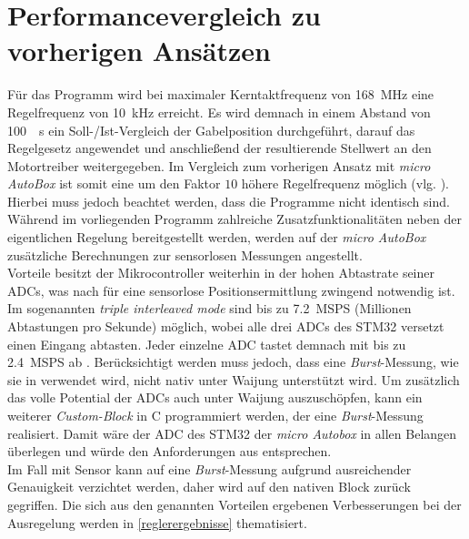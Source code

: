 \section{Performancevergleich zu vorherigen Ansätzen} \label{perfVergl}
Für das Programm wird bei maximaler Kerntaktfrequenz von \SI{168}{MHz} eine Regelfrequenz von \SI{10}{kHz} erreicht. Es wird demnach in einem Abstand von \SI{100}{\mu s} ein Soll-/Ist-Vergleich der Gabelposition durchgeführt, darauf das Regelgesetz angewendet und anschließend der resultierende Stellwert an den Motortreiber weitergegeben. Im Vergleich zum vorherigen Ansatz mit \textit{micro AutoBox} ist somit eine um den Faktor $10$ höhere Regelfrequenz möglich (vlg. \cite{vADP}). Hierbei muss jedoch beachtet werden, dass die Programme nicht identisch sind. Während im vorliegenden Programm zahlreiche Zusatzfunktionalitäten neben der eigentlichen Regelung bereitgestellt werden, werden auf der \textit{micro AutoBox} zusätzliche Berechnungen zur sensorlosen Messungen angestellt. \\
Vorteile besitzt der Mikrocontroller weiterhin in der hohen Abtastrate seiner ADCs, was nach \cite{vADP} für eine sensorlose Positionsermittlung zwingend notwendig ist. Im sogenannten \textit{triple interleaved mode} sind bis zu \SI{7,2}{MSPS} (Millionen Abtastungen pro Sekunde) möglich, wobei alle drei ADCs des STM32 versetzt einen Eingang abtasten. Jeder einzelne ADC tastet demnach mit bis zu \SI{2,4}{MSPS} ab \cite{stm32}. 
Berücksichtigt werden muss jedoch, dass eine \textit{Burst}-Messung, wie sie in \cite{vADP} verwendet wird, nicht nativ unter Waijung  unterstützt wird. Um zusätzlich das volle Potential der ADCs auch unter Waijung auszuschöpfen, kann ein weiterer \textit{Custom-Block} in C programmiert werden, der eine \textit{Burst}-Messung realisiert. Damit wäre der ADC des STM32 der \textit{micro Autobox} in allen Belangen überlegen und würde den Anforderungen aus \cite{vADP} entsprechen.  \\
Im Fall mit Sensor kann auf eine \textit{Burst}-Messung aufgrund ausreichender Genauigkeit verzichtet werden, daher wird auf den nativen Block zurück gegriffen. Die sich aus den genannten Vorteilen ergebenen Verbesserungen bei der Ausregelung werden in \autoref{reglerergebnisse} thematisiert.

